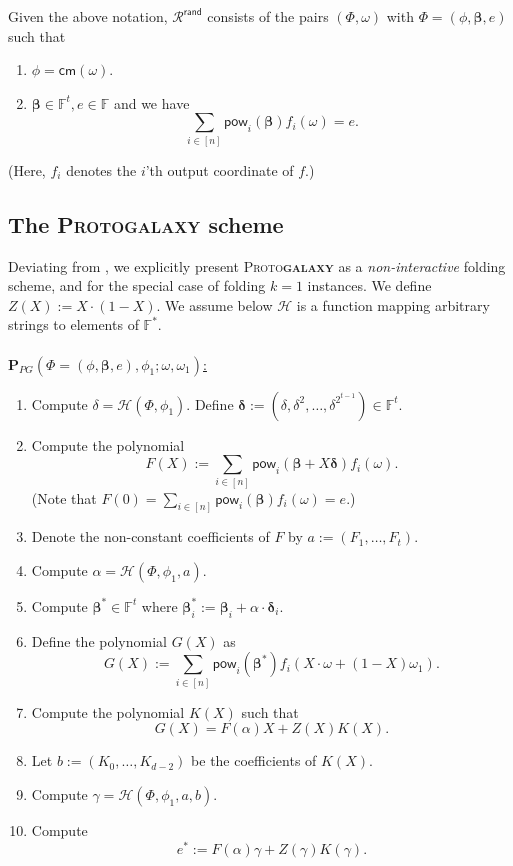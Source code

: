 \documentclass[11pt]{article} %
\newcommand{\protogal}{{\scshape Proto\bfseries{galaxy}}\xspace}
\newcommand{\F}{\ensuremath{\mathbb F}\xspace}
\newcommand{\Fstar}{\ensuremath{\mathbb F^*}\xspace}
\newcommand{\cm}{\ensuremath{\mathsf{cm}}\xspace}
\newcommand{\rej}{\ensuremath{\mathsf{reject}}\xspace}
\newcommand{\defeq}{:=}
\newcommand{\hash}{\ensuremath{\mathcal{H}}\xspace}
\newcommand{\prv}{\ensuremath{\mathsf{\mathbf{P}}}\xspace}
\newcommand{\inst}{\ensuremath{\phi}\xspace}
\newcommand{\wit}{\ensuremath{\mathsf{\omega}}\xspace}
\newcommand{\ver}{\ensuremath{\mathsf{\mathbf{V}}}\xspace}
\newcommand{\relrand}{\ensuremath{\mathcal{R^{\mathsf{rand}}}}\xspace}
\newcommand{\sumi}[1]{\sum_{i\in[#1]}}
\newcommand{\betaa}{\ensuremath{\mathbf{\boldsymbol{\beta}}}\xspace}
\newcommand{\deltaa}{\ensuremath{\mathbf{\boldsymbol{\delta}}}\xspace}
\newcommand{\insttbase}{\ensuremath{\Phi}\xspace}
\newcommand{\pow}{\ensuremath{\mathsf{pow}}\xspace}
\begin{document}
  Given the above notation, $\relrand$ consists of the pairs $( \insttbase,\wit)$ with $\insttbase=(\inst,\betaa,e)$ such that
 \begin{enumerate}
  \item $\inst=\cm(\wit)$.
  \item $\betaa\in \F^t, e\in \F$ and we have 
  \[\sumi{n}\pow_i(\betaa) f_i(\wit) = e.\]
 \end{enumerate}
(Here, $f_i$ denotes the $i$'th output coordinate of $f$.) 
\subsection{The \protogal scheme}
Deviating from \cite{protogalaxy}, we explicitly present \protogal as a \emph{non-interactive} folding scheme, and for the special case of folding $k=1$ instances.
We define $Z(X)\defeq X\cdot(1-X)$. We assume below \hash is a function mapping arbitrary strings to elements of \Fstar. \\ \\ \noindent
\underline{$\prv_{PG}(\insttbase=(\inst,\betaa,e),\inst_1;\wit,\wit_1)$:}
\begin{enumerate}
 \item Compute $\delta=\hash(\insttbase,\inst_1)$. Define $\deltaa\defeq (\delta,\delta^2,\ldots,\delta^{2^{t-1}})\in \F^t$.
 \item\label{step:computeF} Compute the polynomial 
 \[F(X)\defeq \sumi{n}\pow_i(\betaa+X\deltaa) f_i(\wit).\]
 (Note that $F(0)=\sumi{n} \pow_i(\betaa) f_i(\wit) = e$.)
\item\label{step:sendFcoeffs} Denote the non-constant coefficients of $F$ by $a\defeq (F_1,\ldots,F_t)$.
\item Compute $\alpha = \hash(\insttbase,\inst_1,a)$.
\item\label{step:computeBetastar} Compute $\betaa^*\in \F^t$ where $\betaa^*_i\defeq \betaa_i+\alpha\cdot \deltaa_i$.
\item\label{step:computeG} Define the polynomial $G(X)$ as 
\[G(X)\defeq \sumi{n}\pow_i(\betaa^*) f_i(X\cdot \wit + (1-X)\wit_1).\]
\item Compute the polynomial $K(X)$ such that 
\[G(X)= F(\alpha) X + Z(X) K(X).\]
\item\label{step:sendK} Let $b\defeq (K_0,\ldots,K_{d-2})$ be the coefficients of $K(X)$.
\item Compute $\gamma=\hash(\insttbase,\inst_1,a,b)$.
\item\label{step:compute-estar} Compute 
\[e^* \defeq F(\alpha)\gamma + Z(\gamma)K(\gamma).\]
\end{enumerate}
\end{document}
